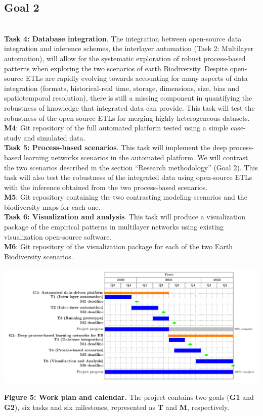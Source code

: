 \documentclass[authoryear,1p,12pt]{elsarticle}
\begin{document}
\subsection{Goal 2}
\\
{\bf Task 4: Database integration}. The integration between
open-source data integration and inference schemes, the interlayer
automation (Task 2: Multilayer automation), will allow for the
systematic exploration of robust process-based patterns when exploring
the two scenarios of earth Biodiversity. Despite open-source ETLs are
rapidly evolving towards accounting for many aspects of data
integration (formats, historical-real time, storage, dimensions, size,
bias and spatiotemporal resolution), there is still a missing
component in quantifying the robustness of knowledge that integrated
data can provide. This task will test the robustness of the
open-source ETLs for merging highly heterogeneous datasets.\\
{\bf M4}: Git repository of the full automated platform tested using a
simple case-study and simulated data.
\\
{\bf Task 5: Process-based scenarios}. This task will implement the
deep process-based learning networks scenarios in the automated
platform. We will contrast the two scenarios described in the section
``Research methodology'' (Goal 2). This task will also test the
robustness of the integrated data using open-source ETLs with
the inference obtained from the two process-based scenarios.\\
{\bf M5}: Git repository containing the two contrasting modeling
scenarios and the biodiversity maps for each one.
\\
{\bf Task 6: Visualization and analysis}. This task will produce a
visualization package of the empirical patterns in multilayer networks
using existing visualization open-source software.\\
{\bf M6}: Git repository of the visualization package for each of the
two Earth Biodiversity scenarios.

\begin{center}
  \hspace{-1.2 in}\includegraphics[width=1.1 \textwidth]{FigureMiles.pdf}
\end{center}
\caption{{\small {\bf Figure 5: Work plan and calendar.} The project
    contains two goals ({\bf G1} and {\bf G2}), six tasks and six
    milestones, represented as {\bf T} and {\bf M}, respectively.}}
\end{document}
